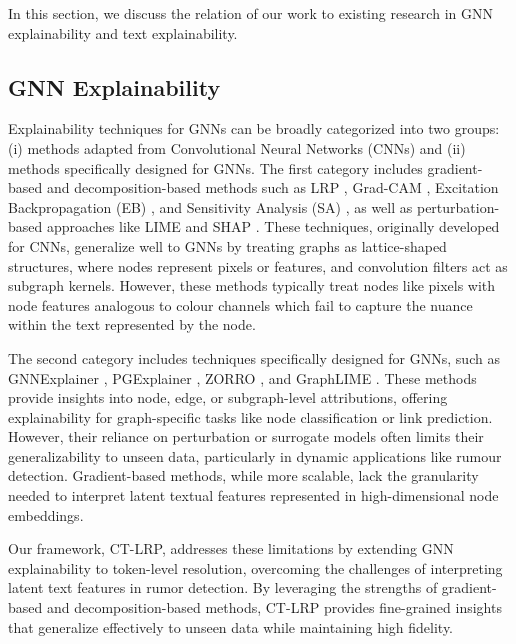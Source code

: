 In this section, we discuss the relation of our work to existing research in GNN explainability and text explainability.

\subsection{GNN Explainability}
Explainability techniques for GNNs can be broadly categorized into two groups: (i) methods adapted from Convolutional Neural Networks (CNNs) and (ii) methods specifically designed for GNNs. The first category includes gradient-based and decomposition-based methods such as LRP \cite{bach2015pixel}, Grad-CAM \cite{Selvaraju2017ICCV}, Excitation Backpropagation (EB) \cite{zhang2018top}, and Sensitivity Analysis (SA) \cite{gevrey2003review}, as well as perturbation-based approaches like LIME \cite{ribeiro2016should} and SHAP \cite{lundberg2017unified}. These techniques, originally developed for CNNs, generalize well to GNNs by treating graphs as lattice-shaped structures, where nodes represent pixels or features, and convolution filters act as subgraph kernels. However, these methods typically treat nodes like pixels with node features analogous to colour channels which fail to capture the nuance within the text represented by the node.

The second category includes techniques specifically designed for GNNs, such as GNNExplainer \cite{ying2019gnnexplainer}, PGExplainer \cite{luo2020parameterized}, ZORRO \cite{funke2022zorro}, and GraphLIME \cite{huang2022graphlime}. These methods provide insights into node, edge, or subgraph-level attributions, offering explainability for graph-specific tasks like node classification or link prediction. However, their reliance on perturbation or surrogate models often limits their generalizability to unseen data, particularly in dynamic applications like rumour detection. Gradient-based methods, while more scalable, lack the granularity needed to interpret latent textual features represented in high-dimensional node embeddings.

Our framework, CT-LRP, addresses these limitations by extending GNN explainability to token-level resolution, overcoming the challenges of interpreting latent text features in rumor detection. By leveraging the strengths of gradient-based and decomposition-based methods, CT-LRP provides fine-grained insights that generalize effectively to unseen data while maintaining high fidelity.


